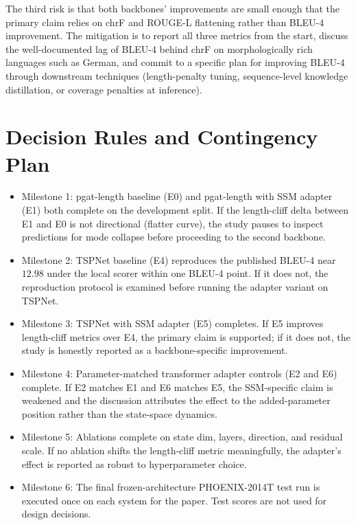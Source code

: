 The third risk is that both backbones' improvements are small enough that the primary claim relies on chrF and ROUGE-L flattening rather than BLEU-4 improvement. The mitigation is to report all three metrics from the start, discuss the well-documented lag of BLEU-4 behind chrF on morphologically rich languages such as German, and commit to a specific plan for improving BLEU-4 through downstream techniques (length-penalty tuning, sequence-level knowledge distillation, or coverage penalties at inference).

\section{Decision Rules and Contingency Plan}

\begin{itemize}
    \item Milestone 1: pgat-length baseline (E0) and pgat-length with SSM adapter (E1) both complete on the development split. If the length-cliff delta between E1 and E0 is not directional (flatter curve), the study pauses to inspect predictions for mode collapse before proceeding to the second backbone.
    \item Milestone 2: TSPNet baseline (E4) reproduces the published BLEU-4 near $12.98$ under the local scorer within one BLEU-4 point. If it does not, the reproduction protocol is examined before running the adapter variant on TSPNet.
    \item Milestone 3: TSPNet with SSM adapter (E5) completes. If E5 improves length-cliff metrics over E4, the primary claim is supported; if it does not, the study is honestly reported as a backbone-specific improvement.
    \item Milestone 4: Parameter-matched transformer adapter controls (E2 and E6) complete. If E2 matches E1 and E6 matches E5, the SSM-specific claim is weakened and the discussion attributes the effect to the added-parameter position rather than the state-space dynamics.
    \item Milestone 5: Ablations complete on state dim, layers, direction, and residual scale. If no ablation shifts the length-cliff metric meaningfully, the adapter's effect is reported as robust to hyperparameter choice.
    \item Milestone 6: The final frozen-architecture PHOENIX-2014T test run is executed once on each system for the paper. Test scores are not used for design decisions.
\end{itemize}

